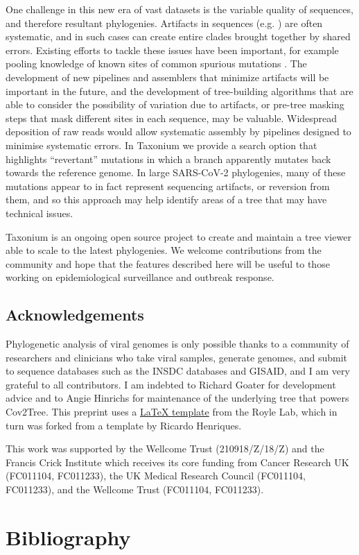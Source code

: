 One challenge in this new era of vast datasets is the variable quality of sequences, and therefore resultant phylogenies. Artifacts in sequences (e.g. \citet{pmid35130474,sanderson2021variation,sanderson2021systematic}) are often systematic, and in such cases can create entire clades brought together by shared errors. Existing efforts to tackle these issues have been important, for example pooling knowledge of known sites of common spurious mutations \citep{de2020masking}. The development of new pipelines and assemblers that minimize artifacts will be important in the future, and the development of tree-building algorithms that are able to consider the possibility of variation due to artifacts, or pre-tree masking steps that mask different sites in each sequence, may be valuable. Widespread deposition of raw reads would allow systematic assembly by pipelines designed to minimise systematic errors. In Taxonium we provide a search option that highlights ``revertant'' mutations in which a branch apparently mutates back towards the reference genome. In large SARS-CoV-2 phylogenies, many of these mutations appear to in fact represent sequencing artifacts, or reversion from them, and so this approach may help identify areas of a tree that may have technical issues. 

Taxonium is an ongoing open source project to create and maintain a tree viewer able to scale to the latest phylogenies. We welcome contributions from the community and hope that the features described here will be useful to those working on epidemiological surveillance and outbreak response.


\small
\subsection*{Acknowledgements}

Phylogenetic analysis of viral genomes is only possible thanks to a community of researchers and clinicians who take viral samples, generate genomes, and submit to sequence databases such as the INSDC databases and GISAID, and I am very grateful to all contributors. I am indebted to Richard Goater for development advice and to Angie Hinrichs for maintenance of the underlying tree that powers Cov2Tree. This preprint uses a \href{https://github.com/roylelab/manuscript-templates}{LaTeX template} from the Royle Lab, which in turn was forked from a template by Ricardo Henriques.

This work was supported by the Wellcome Trust (210918/Z/18/Z) and the Francis Crick Institute which receives its core funding from Cancer Research UK (FC011104, FC011233), the UK Medical Research Council (FC011104, FC011233), and the Wellcome Trust (FC011104, FC011233).



\section*{Bibliography}



